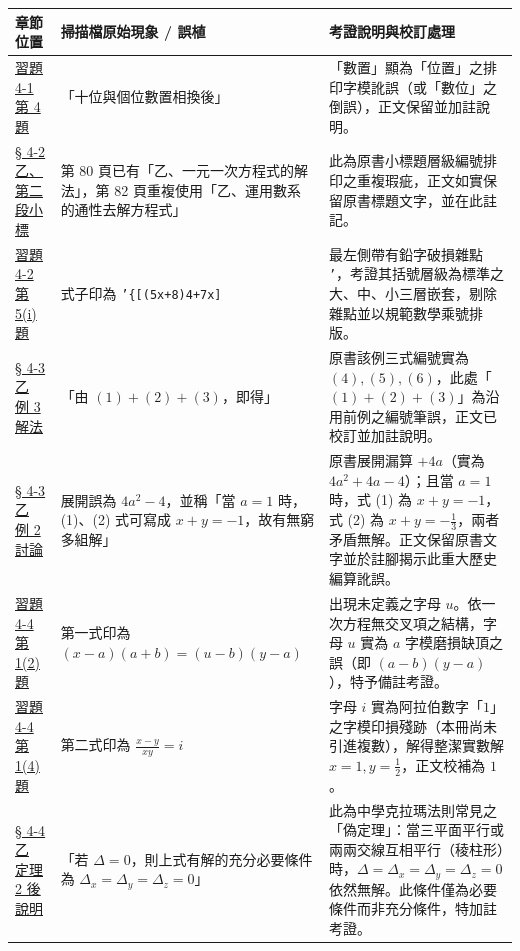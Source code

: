 \documentclass[a4paper,12pt,twoside]{article}
\begin{document}
\begin{table}[H]
\centering
\small
\renewcommand{\arraystretch}{1.35}
\begin{tabularx}{\textwidth}{|p{3.2cm}|p{3.8cm}|X|}
\hline
\textbf{章節位置} & \textbf{掃描檔原始現象 / 誤植} & \textbf{考證說明與校訂處理} \\ \hline

\hyperref[item:ex4-1-4]{習題 4-1 第 4 題} & 
「十位與個位數置相換後」 & 
「數置」顯為「位置」之排印字模訛誤（或「數位」之倒誤），正文保留並加註說明。 \\ \hline

\hyperref[subsec:4-2-b2]{§ 4-2 乙、第二段小標} & 
第 80 頁已有「乙、一元一次方程式的解法」，第 82 頁重複使用「乙、運用數系的通性去解方程式」 & 
此為原書小標題層級編號排印之重複瑕疵，正文如實保留原書標題文字，並在此註記。 \\ \hline

\hyperref[item:ex4-2-5-1]{習題 4-2 第 5(i) 題} & 
式子印為 {\footnotesize\texttt{'\{[(5x+8)4+7x]}}\allowbreak{\footnotesize\texttt{3+9x\}4=5x}} & 
最左側帶有鉛字破損雜點 \texttt{'}，考證其括號層級為標準之大、中、小三層嵌套，剔除雜點並以規範數學乘號排版。 \\ \hline

\hyperref[ex:4-3-6]{§ 4-3 乙 例 3 解法} & 
「由 $(1)+(2)+(3)$，即得」 & 
原書該例三式編號實為 $(4), (5), (6)$，此處「$(1)+(2)+(3)$」為沿用前例之編號筆誤，正文已校訂並加註說明。 \\ \hline

\hyperref[ex:4-3-5]{§ 4-3 乙 例 2 討論} & 
展開誤為 $4a^2-4$，並稱「當 $a=1$ 時，(1)、(2) 式可寫成 $x+y=-1$，故有無窮多組解」 & 
原書展開漏算 $+4a$（實為 $4a^2+4a-4$）；且當 $a=1$ 時，式 (1) 為 $x+y=-1$，式 (2) 為 $x+y=-\frac{1}{3}$，兩者矛盾無解。正文保留原書文字並於註腳揭示此重大歷史編算訛誤。 \\ \hline

\hyperref[item:ex4-4-1-2]{習題 4-4 第 1(2) 題} & 
第一式印為 $(x-a)(a+b) = (u-b)(y-a)$ & 
出現未定義之字母 $u$。依一次方程無交叉項之結構，字母 $u$ 實為 $a$ 字模磨損缺頂之誤（即 $(a-b)(y-a)$），特予備註考證。 \\ \hline

\hyperref[item:ex4-4-1-4]{習題 4-4 第 1(4) 題} & 
第二式印為 $\frac{x-y}{xy} = i$ & 
字母 $i$ 實為阿拉伯數字「$1$」之字模印損殘跡（本冊尚未引進複數），解得整潔實數解 $x=1, y=\frac{1}{2}$，正文校補為 $1$。 \\ \hline

\hyperref[thm:cramer3]{§ 4-4 乙 定理 2 後說明} & 
「若 $\Delta=0$，則上式有解的充分必要條件為 $\Delta_x=\Delta_y=\Delta_z=0$」 & 
此為中學克拉瑪法則常見之「偽定理」：當三平面平行或兩兩交線互相平行（稜柱形）時，$\Delta=\Delta_x=\Delta_y=\Delta_z=0$ 依然無解。此條件僅為必要條件而非充分條件，特加註考證。 \\ \hline


\end{tabularx}
\end{table}
\end{document}
